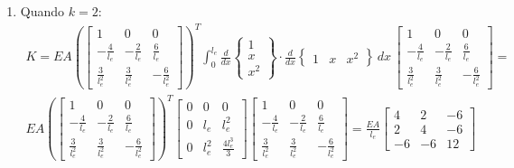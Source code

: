 \begin{tcolorbox}[breakable, colback=white, colframe=black, boxrule=0.4pt, arc=0pt, outer arc=0pt]
\begin{enumerate}[label=\alph*), leftmargin=*]
            \vspace{2mm}
            
            \item Quando $k=2$:
            $$\begin{aligned}
                K = EA \left(\begin{bmatrix} 1 & 0 & 0 \\ -\frac{4}{l_e} & -\frac{2}{l_e} & \frac{6}{l_e} \\ \frac{3}{l_e^2} & \frac{3}{l_e^2} & -\frac{6}{l_e^2} \end{bmatrix}\right)^T \int_{0}^{l_e} \frac{d}{dx}\begin{Bmatrix} 1 \\ x \\ x^2 \end{Bmatrix} \cdot \frac{d}{dx}\begin{Bmatrix} 1 & x & x^2 \end{Bmatrix} \, dx \, \begin{bmatrix} 1 & 0 & 0 \\ -\frac{4}{l_e} & -\frac{2}{l_e} & \frac{6}{l_e} \\ \frac{3}{l_e^2} & \frac{3}{l_e^2} & -\frac{6}{l_e^2} \end{bmatrix} = \\
                EA \left(\begin{bmatrix} 1 & 0 & 0 \\ -\frac{4}{l_e} & -\frac{2}{l_e} & \frac{6}{l_e} \\ \frac{3}{l_e^2} & \frac{3}{l_e^2} & -\frac{6}{l_e^2} \end{bmatrix}\right)^T \begin{bmatrix} 0  & 0 & 0 \\ 0 & l_e & l_e^2 \\ 0 & l_e^2 & \frac{4l_e^3}{3} \end{bmatrix}  \begin{bmatrix} 1 & 0 & 0 \\ -\frac{4}{l_e} & -\frac{2}{l_e} & \frac{6}{l_e} \\ \frac{3}{l_e^2} & \frac{3}{l_e^2} & -\frac{6}{l_e^2} \end{bmatrix} = \frac{EA}{l_e} \begin{bmatrix} 4 & 2 & -6 \\ 2 & 4 & -6 \\ -6 & -6 & 12 \end{bmatrix}
            \end{aligned}$$
        \end{enumerate}
        
        \vspace{2mm} %
    \end{tcolorbox}
\vspace{5mm}

